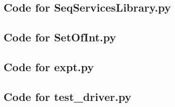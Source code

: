 \documentclass[12pt,fleqn]{examtst}
\begin{document}
\newpage

\subsection*{Code for SeqServicesLibrary.py}

\noindent 

\newpage

\subsection*{Code for SetOfInt.py}

\noindent 

\newpage

\subsection*{Code for expt.py}

\noindent 

\newpage

\subsection*{Code for test\_driver.py}

\noindent 

\newpage

\end{document}
